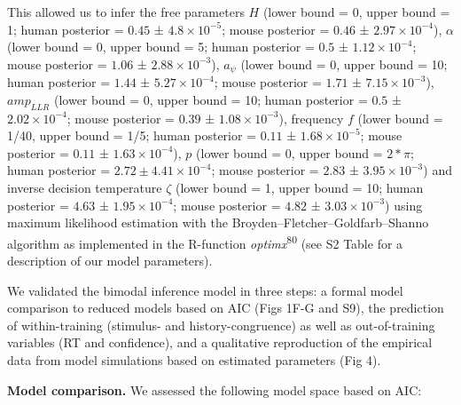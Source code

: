 \documentclass[
]{article}
\begin{document}
This allowed us to infer the free parameters \(H\) (lower bound = 0,
upper bound = 1; human posterior = \(0.45\) ±
\(\ensuremath{4.8\times 10^{-5}}\); mouse posterior = \(0.46\) ±
\(\ensuremath{2.97\times 10^{-4}}\)), \(\alpha\) (lower bound = 0, upper
bound = 5; human posterior = \(0.5\) ±
\(\ensuremath{1.12\times 10^{-4}}\); mouse posterior = \(1.06\) ±
\(\ensuremath{2.88\times 10^{-3}}\)), \(a_{\psi}\) (lower bound = 0,
upper bound = 10; human posterior = \(1.44\) ±
\(\ensuremath{5.27\times 10^{-4}}\); mouse posterior = \(1.71\) ±
\(\ensuremath{7.15\times 10^{-3}}\)), \(amp_{LLR}\) (lower bound = 0,
upper bound = 10; human posterior = \(0.5\) ±
\(\ensuremath{2.02\times 10^{-4}}\); mouse posterior = \(0.39\) ±
\(\ensuremath{1.08\times 10^{-3}}\)), frequency \(f\) (lower bound =
1/40, upper bound = 1/5; human posterior = \(0.11\) ±
\(\ensuremath{1.68\times 10^{-5}}\); mouse posterior = \(0.11\) ±
\(\ensuremath{1.63\times 10^{-4}}\)), \(p\) (lower bound = 0, upper
bound = \(2*\pi\); human posterior =
\(2.72 ± \ensuremath{4.41\times 10^{-4}}\); mouse posterior = \(2.83\) ±
\(\ensuremath{3.95\times 10^{-3}}\)) and inverse decision temperature
\(\zeta\) (lower bound = 1, upper bound = 10; human posterior = \(4.63\)
± \(\ensuremath{1.95\times 10^{-4}}\); mouse posterior = \(4.82\) ±
\(\ensuremath{3.03\times 10^{-3}}\)) using maximum likelihood estimation
with the Broyden--Fletcher--Goldfarb--Shanno algorithm as implemented in
the R-function \emph{optimx}\textsuperscript{80} (see S2 Table for a description of our model parameters).

We validated the bimodal inference model in three steps: a formal model
comparison to reduced models based on AIC (Figs 1F-G and S9), the prediction of within-training (stimulus- and
history-congruence) as well as out-of-training variables (RT and
confidence), and a qualitative reproduction of the empirical data from
model simulations based on estimated parameters (Fig 4).

\textbf{Model comparison.} We assessed the following model space based
on AIC:
\end{document}
